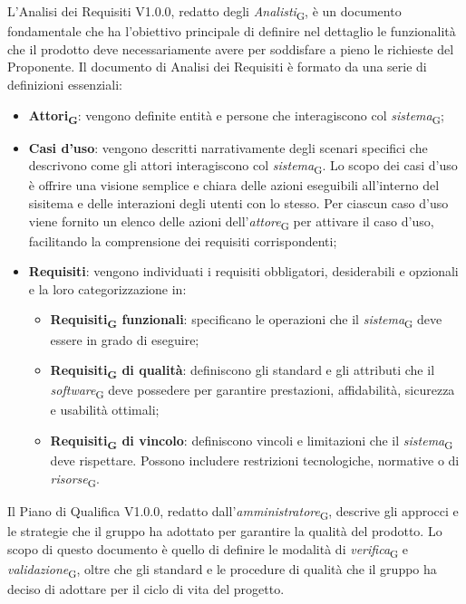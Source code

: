 L'Analisi dei Requisiti V1.0.0, redatto degli \textit{Analisti}\textsubscript{G}, è un documento fondamentale che ha l'obiettivo principale di definire nel dettaglio le funzionalità che il prodotto deve necessariamente avere per soddisfare a pieno le richieste del Proponente. 
Il documento di Analisi dei Requisiti è formato da una serie di definizioni essenziali:
\begin{itemize}
    \item \textbf{Attori\textsubscript{G}}: vengono definite entità e persone che interagiscono col \textit{sistema}\textsubscript{G};
    \item \textbf{Casi d'uso}: vengono descritti narrativamente degli scenari specifici che descrivono come gli attori interagiscono col \textit{sistema}\textsubscript{G}. Lo scopo dei casi d'uso è offrire una visione semplice e chiara delle azioni eseguibili all'interno del sisitema e delle interazioni degli utenti con lo stesso. Per ciascun caso d'uso viene fornito un elenco delle azioni dell'\textit{attore}\textsubscript{G} per attivare il caso d'uso, facilitando la comprensione dei requisiti corrispondenti;
    \item \textbf{Requisiti}: vengono individuati i requisiti obbligatori, desiderabili e opzionali e la loro categorizzazione in: 
    \begin{itemize}
        \item \textbf{Requisiti\textsubscript{G} funzionali}: specificano le operazioni che il \textit{sistema}\textsubscript{G} deve essere in grado di eseguire; 
        \item \textbf{Requisiti\textsubscript{G} di qualità}: definiscono gli standard e gli attributi che il \textit{software}\textsubscript{G} deve possedere per garantire prestazioni, affidabilità, sicurezza e usabilità ottimali;
        \item \textbf{Requisiti\textsubscript{G} di vincolo}: definiscono vincoli e limitazioni che il \textit{sistema}\textsubscript{G} deve rispettare. Possono includere restrizioni tecnologiche, normative o di \textit{risorse}\textsubscript{G}.
    \end{itemize}
\end{itemize}
Il Piano di Qualifica V1.0.0, redatto dall'\textit{amministratore}\textsubscript{G}, descrive gli approcci e le strategie che il gruppo ha adottato per garantire la qualità del prodotto. Lo scopo di questo documento è quello di definire le modalità di \textit{verifica}\textsubscript{G} e \textit{validazione}\textsubscript{G}, oltre che gli standard e le procedure di qualità che il gruppo ha deciso di adottare per il ciclo di vita del progetto. \\ 
